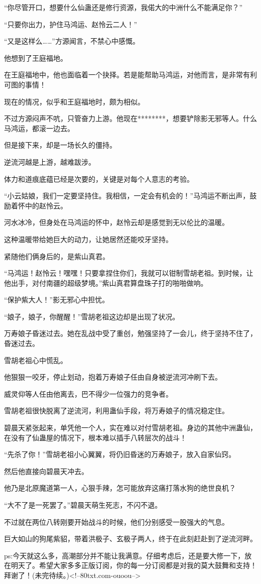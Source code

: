 \begin{this_body}
“你尽管开口，想要什么仙蛊还是修行资源，我偌大的中洲什么不能满足你？”

“只要你出力，护住马鸿运、赵怜云二人！”

“又是这样么……”方源闻言，不禁心中感慨。

他想到了王庭福地。

在王庭福地中，他也面临着一个抉择。若是能帮助马鸿运，对他而言，是非常有利可图的事情！

现在的情况，似乎和王庭福地时，颇为相似。

不过方源闷声不吭，只管奋力上游。他现在********，想要铲除影无邪等人。什么马鸿运，都滚一边去。

但是接下来，却是一场长久的僵持。

逆流河越是上游，越难跋涉。

体力和道痕底蕴已经是次要的，关键是对每个人意志的考验。

“小云姑娘，我们一定要坚持住。我相信，一定会有机会的！”马鸿运不断出声，鼓励着怀中的赵怜云。

河水冰冷，但身处在马鸿运的怀中，赵怜云却是感觉到无以伦比的温暖。

这种温暖带给她巨大的动力，让她居然还能咬牙坚持。

紧随他们俩身后的，是紫山真君。

“马鸿运！赵怜云！嘿嘿！只要拿捏住你们，我就可以钳制雪胡老祖。到时候，让他出手，对付南疆的超级梦境。”紫山真君算盘珠子打的啪啪做响。

“保护紫大人！”影无邪心中担忧。

“娘子，娘子，你醒醒！”雪胡老祖这边却是出现了状况。

万寿娘子昏迷过去。她在乱战中受了重创，勉强坚持了一会儿，终于坚持不住了，昏迷过去。

雪胡老祖心中慌乱。

他狠狠一咬牙，停止划动，抱着万寿娘子任由自身被逆流河冲刷下去。

威灵仰等人任由他离去，巴不得少一位强力的竞争者。

雪胡老祖很快脱离了逆流河，利用蛊仙手段，将万寿娘子的情况稳定住。

碧晨天紧张起来，单凭他一个人，实在难以对付雪胡老祖。身边的其他中洲蛊仙，在没有了仙蛊屋的情况下，根本难以插手八转层次的战斗！

“先杀了你！”雪胡老祖小心翼翼，将仍旧昏迷的万寿娘子，放入自家仙窍。

然后他直接向碧晨天冲去。

他乃是北原魔道第一人，心狠手辣，怎可能放弃这痛打落水狗的绝世良机？

“大不了是一死罢了。”碧晨天萌生死志，不闪不退。

不过就在两位八转刚要开始战斗的时候，他们分别感受一股强大的气息。

巨大如山的狗尾紫貂，带着洪极子、玄极子两人，终于在此刻赶赴到了逆流河畔。

ps:今天就这么多，高潮部分并不能让我满意。仔细考虑后，还是要大修一下，放在明天了。希望大家多多正版订阅，你的每一分订阅都是对我的莫大鼓舞和支持！拜谢了！(未完待续。)<!--80txt.com-ouoou-->

\end{this_body}

